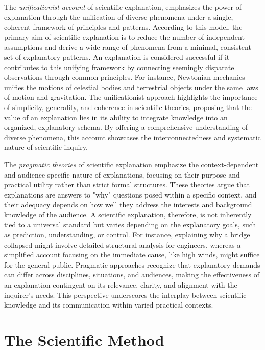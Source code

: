 The \emph{unificationist account} of scientific explanation, emphasizes the power of explanation through the unification of diverse phenomena under a single, coherent framework of principles and patterns. According to this model, the primary aim of scientific explanation is to reduce the number of independent assumptions and derive a wide range of phenomena from a minimal, consistent set of explanatory patterns. An explanation is considered successful if it contributes to this unifying framework by connecting seemingly disparate observations through common principles. For instance, Newtonian mechanics unifies the motions of celestial bodies and terrestrial objects under the same laws of motion and gravitation. The unificationist approach highlights the importance of simplicity, generality, and coherence in scientific theories, proposing that the value of an explanation lies in its ability to integrate knowledge into an organized, explanatory schema. By offering a comprehensive understanding of diverse phenomena, this account showcases the interconnectedness and systematic nature of scientific inquiry.

The \emph{pragmatic theories} of scientific explanation emphasize the context-dependent and audience-specific nature of explanations, focusing on their purpose and practical utility rather than strict formal structures. These theories argue that explanations are answers to "why" questions posed within a specific context, and their adequacy depends on how well they address the interests and background knowledge of the audience. A scientific explanation, therefore, is not inherently tied to a universal standard but varies depending on the explanatory goals, such as prediction, understanding, or control. For instance, explaining why a bridge collapsed might involve detailed structural analysis for engineers, whereas a simplified account focusing on the immediate cause, like high winds, might suffice for the general public. Pragmatic approaches recognize that explanatory demands can differ across disciplines, situations, and audiences, making the effectiveness of an explanation contingent on its relevance, clarity, and alignment with the inquirer's needs. This perspective underscores the interplay between scientific knowledge and its communication within varied practical contexts.


%
%

\section{The Scientific Method}

